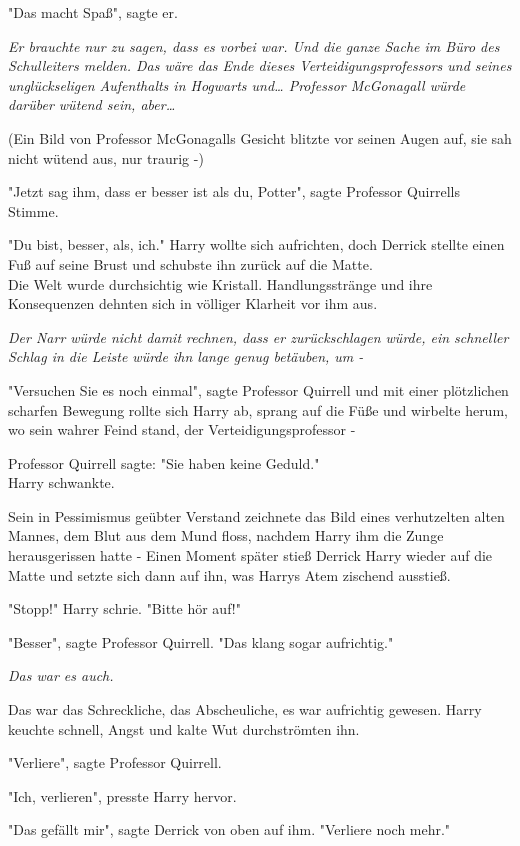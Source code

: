 {"Das macht Spaß", sagte er.

\emph{Er brauchte nur zu sagen, dass es vorbei war. Und die ganze Sache im Büro des Schulleiters melden. Das wäre das Ende dieses Verteidigungsprofessors und seines unglückseligen Aufenthalts in Hogwarts und… Professor McGonagall würde darüber wütend sein, aber…}

(Ein Bild von Professor McGonagalls Gesicht blitzte vor seinen Augen auf, sie sah nicht wütend aus, nur traurig -)

"Jetzt sag ihm, dass er besser ist als du, Potter", sagte Professor Quirrells Stimme.

"Du bist, besser, als, ich." Harry wollte sich aufrichten, doch Derrick stellte einen Fuß auf seine Brust und schubste ihn zurück auf die Matte.\\ Die Welt wurde durchsichtig wie Kristall. Handlungsstränge und ihre Konsequenzen dehnten sich in völliger Klarheit vor ihm aus.

\emph{Der Narr würde nicht damit rechnen, dass er zurückschlagen würde, ein schneller Schlag in die Leiste würde ihn lange genug betäuben, um -}

"Versuchen Sie es noch einmal", sagte Professor Quirrell und mit einer plötzlichen scharfen Bewegung rollte sich Harry ab, sprang auf die Füße und wirbelte herum, wo sein wahrer Feind stand, der Verteidigungsprofessor -

Professor Quirrell sagte: "Sie haben keine Geduld."\\ Harry schwankte.

Sein in Pessimismus geübter Verstand zeichnete das Bild eines verhutzelten alten Mannes, dem Blut aus dem Mund floss, nachdem Harry ihm die Zunge herausgerissen hatte - Einen Moment später stieß Derrick Harry wieder auf die Matte und setzte sich dann auf ihn, was Harrys Atem zischend ausstieß.

"Stopp!" Harry schrie. "Bitte hör auf!"

"Besser", sagte Professor Quirrell. "Das klang sogar aufrichtig."

\emph{Das war es auch.}

Das war das Schreckliche, das Abscheuliche, es war aufrichtig gewesen. Harry keuchte schnell, Angst und kalte Wut durchströmten ihn.

"Verliere", sagte Professor Quirrell.

"Ich, verlieren", presste Harry hervor.

"Das gefällt mir", sagte Derrick von oben auf ihm. "Verliere noch mehr."

}
